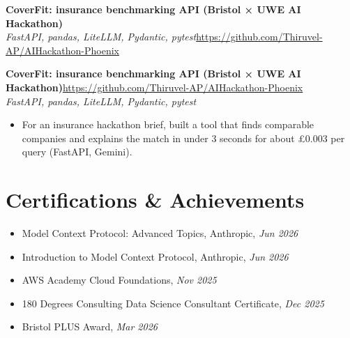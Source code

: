\documentclass[a4paper,11pt]{article}
\newcommand{\project}[3]{%
  \textbf{#1}\hfill#3\\ {\color{muted}\small\textit{#2}}\par}
\begin{document}
\else
\textbf{CoverFit: insurance benchmarking API (Bristol × UWE AI Hackathon)}\\ {\color{muted}\small\textit{FastAPI, pandas, LiteLLM, Pydantic, pytest}}\hfill{\small\url{https://github.com/Thiruvel-AP/AIHackathon-Phoenix}}\par
\fi
\else
\project{CoverFit: insurance benchmarking API (Bristol × UWE AI Hackathon)}{FastAPI, pandas, LiteLLM, Pydantic, pytest}{\url{https://github.com/Thiruvel-AP/AIHackathon-Phoenix}}
\fi
\begin{itemize}
  \item For an insurance hackathon brief, built a tool that finds comparable companies and explains the match in under 3 seconds for about £0.003 per query (FastAPI, Gemini).
\end{itemize}


\section{Certifications \& Achievements}
\begin{itemize}
  \item Model Context Protocol: Advanced Topics, Anthropic, \textit{Jun 2026}
  \item Introduction to Model Context Protocol, Anthropic, \textit{Jun 2026}
  \item AWS Academy Cloud Foundations, \textit{Nov 2025}
  \item 180 Degrees Consulting Data Science Consultant Certificate, \textit{Dec 2025}
  \item Bristol PLUS Award, \textit{Mar 2026}
\end{itemize}
\end{document}
